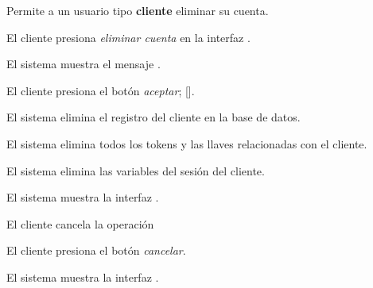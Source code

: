 %
%

{
  Permite a un usuario tipo \textbf{cliente} eliminar su cuenta.

  \begin{trayectoriaPrincipal}

    \item El cliente presiona \textit{eliminar cuenta} en la
      interfaz .

    \item El sistema muestra el mensaje .

    \item El cliente presiona el botón \textit{aceptar};
      [].

    \item El sistema elimina el registro del cliente en la base de datos.

    \item El sistema elimina todos los tokens y las llaves relacionadas con el
      cliente.

    \item El sistema elimina las variables del sesión del cliente.

    \item El sistema muestra la interfaz .

  \end{trayectoriaPrincipal}


  \begin{trayectoriaAlternativa}[ta:cancelar]
    {El cliente cancela la operación}

    \item El cliente presiona el botón \textit{cancelar}.

    \item El sistema muestra la interfaz
      .

  \end{trayectoriaAlternativa}
}
